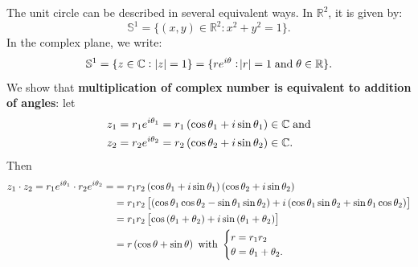 \documentclass[11pt,openany]{article}
\renewcommand{\Re}{\operatorname*{Re}}
\renewcommand{\Im}{\operatorname*{Im}}
\begin{document}
\begin{center}
\end{center}
The unit circle can be described in several equivalent ways. In \(\mathbb{R}^2\), it is given by:
\[
\mathbb{S}^1 = \{ (x,y) \in \mathbb{R}^2 : x^2 + y^2 = 1 \}.
\]
In the complex plane, we write:
\[
\mathbb{S}^1 = \{ z \in \mathbb{C} : |z| = 1 \} = \{ re^{i\theta} : \abs{r}=1\;\text{and}\;\theta \in \mathbb{R} \}.
\]
We show that \textbf{multiplication of complex number is equivalent to addition of angles}:
let \begin{align*}
	z_1&= r_1e^{i\theta_1}=r_1\left( \cos\theta_1+i\sin\theta_1 \right)\in\mathbb{C}\;\text{and}\\
	z_2&= r_2e^{i\theta_2}=r_2\left( \cos\theta_2+i\sin\theta_2 \right)\in\mathbb{C}.
\end{align*} Then \begin{align*}
	z_1\cdot z_2=r_1e^{i\theta_1}\cdot r_2e^{i\theta_2}=&=r_1r_2\left( \cos\theta_1+i\sin\theta_1 \right)\left( \cos\theta_2+i\sin\theta_2 \right)\\
	&=r_1r_2\left[\left( \cos\theta_1\cos\theta_2-\sin\theta_1\sin\theta_2 \right)+i\left( \cos\theta_1\sin\theta_2+\sin\theta_1\cos\theta_2 \right)\right]\\
	&=r_1r_2\left[\cos\left( \theta_1+\theta_2 \right)+i\sin\left( \theta_1+\theta_2 \right)\right]\\
	&=r\left( \cos\theta+\sin\theta \right)\ \text{with}\ \begin{cases}
		r=r_1r_2\\
		\theta=\theta_1+\theta_2.
	\end{cases}
\end{align*}
\end{document}
